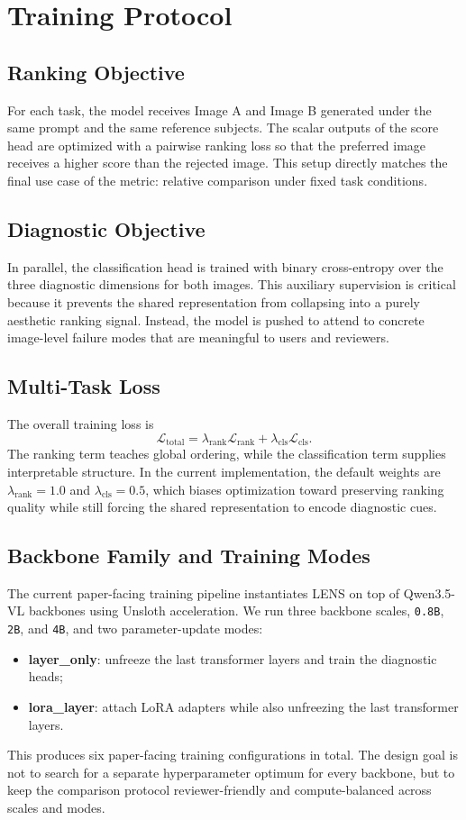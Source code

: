 \section{Training Protocol}

\subsection{Ranking Objective}
For each task, the model receives Image A and Image B generated under the same prompt and the same reference subjects. The scalar outputs of the score head are optimized with a pairwise ranking loss so that the preferred image receives a higher score than the rejected image. This setup directly matches the final use case of the metric: relative comparison under fixed task conditions.

\subsection{Diagnostic Objective}
In parallel, the classification head is trained with binary cross-entropy over the three diagnostic dimensions for both images. This auxiliary supervision is critical because it prevents the shared representation from collapsing into a purely aesthetic ranking signal. Instead, the model is pushed to attend to concrete image-level failure modes that are meaningful to users and reviewers.

\subsection{Multi-Task Loss}
The overall training loss is
\[
\mathcal{L}_{\text{total}} = \lambda_{\text{rank}}\mathcal{L}_{\text{rank}} + \lambda_{\text{cls}}\mathcal{L}_{\text{cls}}.
\]
The ranking term teaches global ordering, while the classification term supplies interpretable structure. In the current implementation, the default weights are $\lambda_{\text{rank}} = 1.0$ and $\lambda_{\text{cls}} = 0.5$, which biases optimization toward preserving ranking quality while still forcing the shared representation to encode diagnostic cues.

\subsection{Backbone Family and Training Modes}
The current paper-facing training pipeline instantiates LENS on top of Qwen3.5-VL backbones using Unsloth acceleration. We run three backbone scales, \texttt{0.8B}, \texttt{2B}, and \texttt{4B}, and two parameter-update modes:
\begin{itemize}
    \item \textbf{layer\_only}: unfreeze the last transformer layers and train the diagnostic heads;
    \item \textbf{lora\_layer}: attach LoRA adapters while also unfreezing the last transformer layers.
\end{itemize}
This produces six paper-facing training configurations in total. The design goal is not to search for a separate hyperparameter optimum for every backbone, but to keep the comparison protocol reviewer-friendly and compute-balanced across scales and modes.

